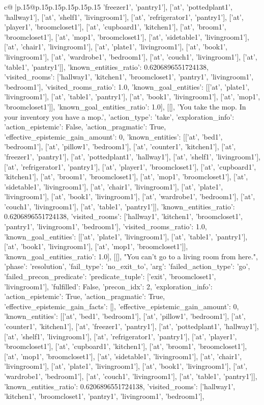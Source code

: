 \documentclass{article}
\begin{document}
{\begin{supertabular}{c@{$\;$}|p{.15\linewidth}@{}p{.15\linewidth}p{.15\linewidth}p{.15\linewidth}p{.15\linewidth}p{.15\linewidth}}
{{{'freezer1', 'pantry1'], ['at', 'pottedplant1', 'hallway1'], ['at', 'shelf1', 'livingroom1'], ['at', 'refrigerator1', 'pantry1'], ['at', 'player1', 'broomcloset1'], ['at', 'cupboard1', 'kitchen1'], ['at', 'broom1', 'broomcloset1'], ['at', 'mop1', 'broomcloset1'], ['at', 'sidetable1', 'livingroom1'], ['at', 'chair1', 'livingroom1'], ['at', 'plate1', 'livingroom1'], ['at', 'book1', 'livingroom1'], ['at', 'wardrobe1', 'bedroom1'], ['at', 'couch1', 'livingroom1'], ['at', 'table1', 'pantry1']], 'known_entities_ratio': 0.6206896551724138, 'visited_rooms': ['hallway1', 'kitchen1', 'broomcloset1', 'pantry1', 'livingroom1', 'bedroom1'], 'visited_rooms_ratio': 1.0, 'known_goal_entities': [['at', 'plate1', 'livingroom1'], ['at', 'table1', 'pantry1'], ['at', 'book1', 'livingroom1'], ['at', 'mop1', 'broomcloset1']], 'known_goal_entities_ratio': 1.0}}], [[], 'You take the mop. In your inventory you have a mop.', {'action_type': 'take', 'exploration_info': {'action_epistemic': False, 'action_pragmatic': True, 'effective_epistemic_gain_amount': 0, 'known_entities': [['at', 'bed1', 'bedroom1'], ['at', 'pillow1', 'bedroom1'], ['at', 'counter1', 'kitchen1'], ['at', 'freezer1', 'pantry1'], ['at', 'pottedplant1', 'hallway1'], ['at', 'shelf1', 'livingroom1'], ['at', 'refrigerator1', 'pantry1'], ['at', 'player1', 'broomcloset1'], ['at', 'cupboard1', 'kitchen1'], ['at', 'broom1', 'broomcloset1'], ['at', 'mop1', 'broomcloset1'], ['at', 'sidetable1', 'livingroom1'], ['at', 'chair1', 'livingroom1'], ['at', 'plate1', 'livingroom1'], ['at', 'book1', 'livingroom1'], ['at', 'wardrobe1', 'bedroom1'], ['at', 'couch1', 'livingroom1'], ['at', 'table1', 'pantry1']], 'known_entities_ratio': 0.6206896551724138, 'visited_rooms': ['hallway1', 'kitchen1', 'broomcloset1', 'pantry1', 'livingroom1', 'bedroom1'], 'visited_rooms_ratio': 1.0, 'known_goal_entities': [['at', 'plate1', 'livingroom1'], ['at', 'table1', 'pantry1'], ['at', 'book1', 'livingroom1'], ['at', 'mop1', 'broomcloset1']], 'known_goal_entities_ratio': 1.0}}], [[], "You can't go to a living room from here.", {'phase': 'resolution', 'fail_type': 'no_exit_to', 'arg': {'failed_action_type': 'go', 'failed_precon_predicate': {'predicate_tuple': ['exit', 'broomcloset1', 'livingroom1'], 'fulfilled': False, 'precon_idx': 2}}, 'exploration_info': {'action_epistemic': True, 'action_pragmatic': True, 'effective_epistemic_gain_facts': [], 'effective_epistemic_gain_amount': 0, 'known_entities': [['at', 'bed1', 'bedroom1'], ['at', 'pillow1', 'bedroom1'], ['at', 'counter1', 'kitchen1'], ['at', 'freezer1', 'pantry1'], ['at', 'pottedplant1', 'hallway1'], ['at', 'shelf1', 'livingroom1'], ['at', 'refrigerator1', 'pantry1'], ['at', 'player1', 'broomcloset1'], ['at', 'cupboard1', 'kitchen1'], ['at', 'broom1', 'broomcloset1'], ['at', 'mop1', 'broomcloset1'], ['at', 'sidetable1', 'livingroom1'], ['at', 'chair1', 'livingroom1'], ['at', 'plate1', 'livingroom1'], ['at', 'book1', 'livingroom1'], ['at', 'wardrobe1', 'bedroom1'], ['at', 'couch1', 'livingroom1'], ['at', 'table1', 'pantry1']], 'known_entities_ratio': 0.6206896551724138, 'visited_rooms': ['hallway1', 'kitchen1', 'broomcloset1', 'pantry1', 'livingroom1', 'bedroom1'], }}}
\end{supertabular}}
\end{document}
